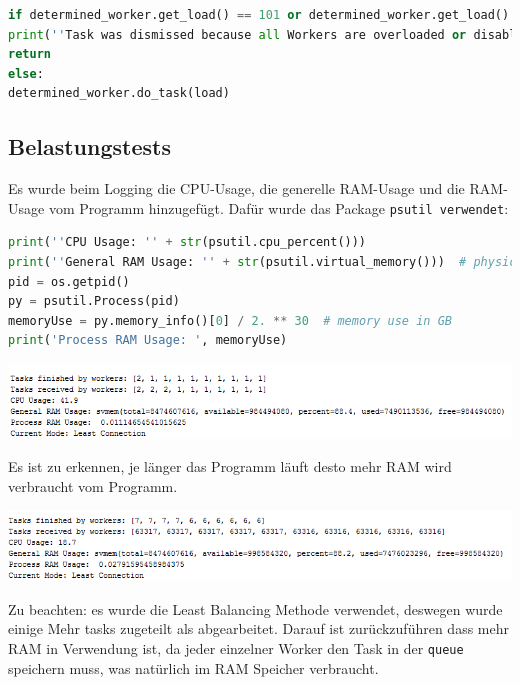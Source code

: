 \begin{lstlisting}[language=python]
if determined_worker.get_load() == 101 or determined_worker.get_load() == 99:
print(''Task was dismissed because all Workers are overloaded or disabled!'')
return
else:
determined_worker.do_task(load)
\end{lstlisting}

\subsection{Belastungstests}
Es wurde beim Logging die CPU-Usage, die generelle RAM-Usage und die RAM-Usage vom Programm hinzugefügt. Dafür wurde das Package \verb|psutil verwendet|:

\begin{lstlisting}[language=python]
print(''CPU Usage: '' + str(psutil.cpu_percent()))
print(''General RAM Usage: '' + str(psutil.virtual_memory()))  # physical memory usage
pid = os.getpid()
py = psutil.Process(pid)
memoryUse = py.memory_info()[0] / 2. ** 30  # memory use in GB
print('Process RAM Usage: ', memoryUse)
\end{lstlisting}

\begin{minipage}{\linewidth}
	\centering
	\includegraphics[width=1\linewidth]{images/belastung}
\end{minipage}

Es ist zu erkennen, je länger das Programm läuft desto mehr RAM wird verbraucht vom Programm.

\begin{minipage}{\linewidth}
	\centering
	\includegraphics[width=1\linewidth]{images/belastung2}
\end{minipage}

Zu beachten: es wurde die Least Balancing Methode verwendet, deswegen wurde einige Mehr tasks zugeteilt als abgearbeitet. Darauf ist zurückzuführen dass mehr RAM in Verwendung ist, da jeder einzelner Worker den Task in der \verb|queue| speichern muss, was natürlich im RAM Speicher verbraucht. 

